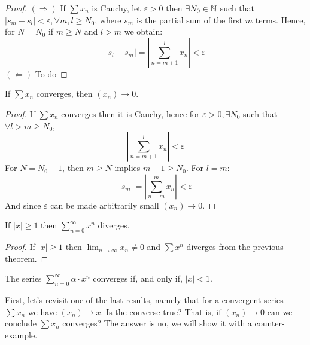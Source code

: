 \begin{proof}
    $(\Longrightarrow)$ If $\sum x_n$ is Cauchy, let $\varepsilon > 0$ then $\exists N_0 \in \mathbb{N}$ such that $|s_m-s_l| < \varepsilon, \forall m,l \geq N_0$, where $s_m$ is the partial sum of the first $m$ terms. Hence, for $N = N_0$ if $m \geq N$ and $l > m$ we obtain:
    \begin{equation*}
        |s_l - s_m| 
        =\left |
            \sum \limits_{n=m+1}^l x_n 
        \right |
        < \varepsilon
    \end{equation*}
    $(\Longleftarrow)$ To-do
\end{proof}

\begin{theorem}
    If $\sum x_n$ converges, then $(x_n) \to 0$.
\end{theorem}

\begin{proof}
    If $\sum x_n$ converges then it is Cauchy, hence for $\varepsilon > 0, \exists N_0$ such that $\forall l > m \geq N_0$, 
    \begin{equation*}
        \left |
            \sum \limits_{n=m+1}^l x_n
        \right | < \varepsilon
    \end{equation*}
    For $N  = N_0 + 1$, then $m \geq N$ implies $m-1 \geq N_0$. For $l = m$:
    \begin{equation*}
        |s_m| = \left |
            \sum \limits_{n=m}^m x_n
        \right |
        < \varepsilon
    \end{equation*}
    And since $\varepsilon$ can be made arbitrarily small $(x_n) \to 0$.
\end{proof}

\begin{theorem}
    If $|x| \geq 1$ then $\sum_{n=0}^\infty x^n$ diverges.
\end{theorem}

\begin{proof}
    If $|x| \geq 1$ then $\lim_{n \to \infty} x_n \neq 0$ and $\sum x^n$ diverges from the previous theorem.
\end{proof}

\begin{corollary}
    The series $\sum _{n=0}^\infty \alpha \cdot x^n$ converges if, and only if, $|x| < 1$.
\end{corollary}

First, let's revisit one of the last results, namely that for a convergent series $\sum x_n$ we have $(x_n) \to x$. Is the converse true? That is, if $(x_n) \to 0$ can we conclude $\sum x_n$ converges? The answer is no, we will show it with a counter-example.

